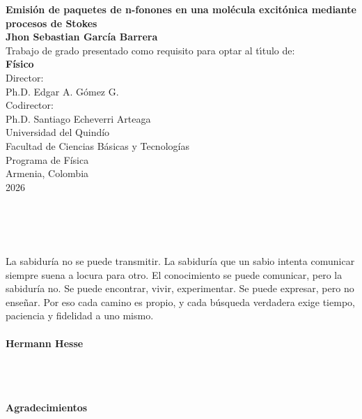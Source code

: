 \newpage{\pagestyle{empty}\cleardoublepage}

\newpage
\begin{center}
\thispagestyle{empty} \vspace*{0.5cm} \textbf{\huge
Emisión de paquetes de n-fonones en una molécula excitónica mediante procesos de Stokes}\\[3.0cm]
\Large\textbf{Jhon Sebastian García Barrera}\\[3.5cm]
\small Trabajo de grado presentado como requisito para optar al
t\'{\i}tulo de:\\
\textbf{Físico}\\[3.0cm]
Director:\\
Ph.D. Edgar A. Gómez G.\\
Codirector:\\
Ph.D. Santiago Echeverri Arteaga\\[3.0cm]
Universidad del Quindío\\
Facultad de Ciencias Básicas y Tecnologías\\
Programa de Física\\
Armenia, Colombia\\
2026\\
\end{center}

\newpage{\pagestyle{empty}\cleardoublepage}

\newpage
\thispagestyle{empty} \textbf{}\normalsize
\\\\\\%
[4.0cm]

\begin{flushright}
\begin{minipage}{10cm}
    \noindent
        \small
        La sabiduría no se puede transmitir. La sabiduría que un sabio intenta comunicar siempre suena a locura para otro. El conocimiento se puede comunicar, pero la sabiduría no. Se puede encontrar, vivir, experimentar. Se puede expresar, pero no enseñar. Por eso cada camino es propio, y cada búsqueda verdadera exige tiempo, paciencia y fidelidad a uno mismo.\\\\
        \textbf{Hermann Hesse}\\
\end{minipage}
\end{flushright}

\newpage{\pagestyle{empty}\cleardoublepage}

\newpage
\thispagestyle{empty} \textbf{}\normalsize
\\\\\\%
\textbf{\LARGE Agradecimientos}
\\\\

